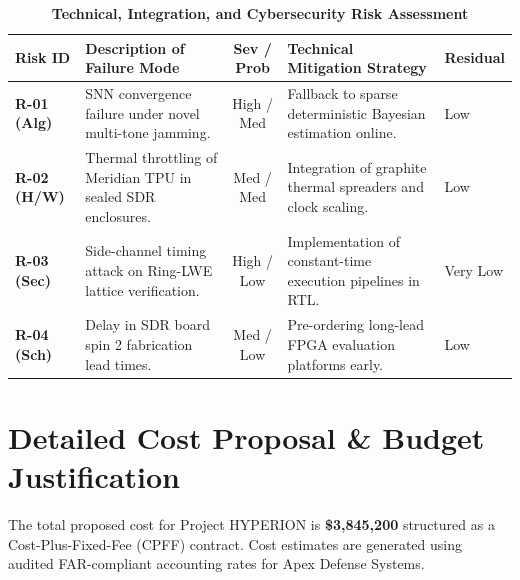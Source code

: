 \documentclass[10pt,a4paper]{article}
\begin{document}
\vspace{2pt}

\begin{table}[h!]
\centering
\caption{\color{NavyPrimary}\bfseries Technical, Integration, and Cybersecurity Risk Assessment}
\vspace{2pt}
\small
\begin{tabularx}{\linewidth}{@{}l X c X l@{}}
\toprule
\rowcolor{LightBg}
\textbf{Risk ID} & \textbf{Description of Failure Mode} & \textbf{Sev / Prob} & \textbf{Technical Mitigation Strategy} & \textbf{Residual} \\
\midrule
\textbf{R-01 (Alg)} & SNN convergence failure under novel multi-tone jamming. & High / Med & Fallback to sparse deterministic Bayesian estimation online. & Low \\
\midrule
\textbf{R-02 (H/W)} & Thermal throttling of Meridian TPU in sealed SDR enclosures. & Med / Med & Integration of graphite thermal spreaders and clock scaling. & Low \\
\midrule
\textbf{R-03 (Sec)} & Side-channel timing attack on Ring-LWE lattice verification. & High / Low & Implementation of constant-time execution pipelines in RTL. & Very Low \\
\midrule
\textbf{R-04 (Sch)} & Delay in SDR board spin 2 fabrication lead times. & Med / Low & Pre-ordering long-lead FPGA evaluation platforms early. & Low \\
\bottomrule
\end{tabularx}
\end{table}

\newpage

\section{Detailed Cost Proposal \& Budget Justification}

The total proposed cost for Project HYPERION is \textbf{\$3,845,200} structured as a Cost-Plus-Fixed-Fee (CPFF) contract. Cost estimates are generated using audited FAR-compliant accounting rates for Apex Defense Systems.

\vspace{3pt}
\end{document}
